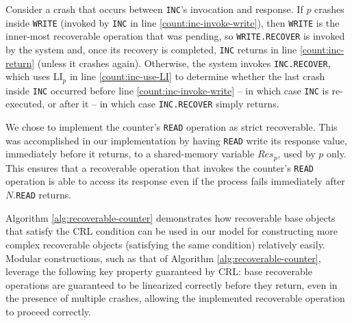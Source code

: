 Consider a crash that occurs between \texttt{INC}'s invocation and response.
If $p$ crashes inside \texttt{WRITE} (invoked by \texttt{INC} in line
\ref{count:inc-invoke-write}), then \texttt{WRITE} is the inner-most recoverable operation that was pending, so \texttt{WRITE.RECOVER} is invoked by the system and, once its recovery is completed, \texttt{INC} returns in line \ref{count:inc-return} (unless it crashes again). Otherwise, the system invokes \texttt{INC.RECOVER}, which uses $\text{LI}_p$ in line \ref{count:inc-use-LI} to determine whether the last crash inside \texttt{INC} occurred before line \ref{count:inc-invoke-write} -- in which case \texttt{INC} is re-executed, or after it -- in which case \texttt{INC.RECOVER} simply returns.








We chose to implement the counter's \texttt{READ} operation as strict recoverable. This was accomplished in our implementation by having \texttt{READ} write its response value, immediately before it returns, to a shared-memory variable $Res_p$, used by $p$ only. This ensures that a recoverable operation that invokes the counter's \texttt{READ} operation is able to access its response even if the process fails immediately after $N$.\texttt{READ} returns.


Algorithm \ref{alg:recoverable-counter} demonstrates how recoverable base objects that satisfy the CRL condition can be used in our model for constructing more complex recoverable objects (satisfying the same condition) relatively easily. Modular constructions, such as that of Algorithm \ref{alg:recoverable-counter}, leverage the following key property guaranteed by CRL: base recoverable operations are guaranteed to be linearized correctly before they return, even in the presence of multiple crashes, allowing the implemented recoverable operation to proceed correctly.


